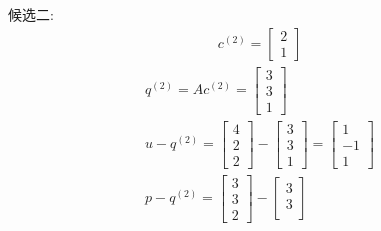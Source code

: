 \documentclass[12pt]{article}
\begin{document}
\begin{flushleft}
    候选二: \\
    \begin{align}
        c^{(2)} = \begin{bmatrix}
                      2 \\
                      1
                  \end{bmatrix}
    \end{align}
    \begin{align}
        q^{(2)} = Ac^{(2)} = \begin{bmatrix}
                                 3 \\
                                 3 \\
                                 1
                             \end{bmatrix}                           \\
        u -q^{(2)} = \begin{bmatrix}
                         4 \\
                         2 \\
                         2
                     \end{bmatrix} - \begin{bmatrix}
                                         3 \\
                                         3 \\
                                         1
                                     \end{bmatrix} =  \begin{bmatrix}
                                                          1  \\
                                                          -1 \\
                                                          1
                                                      \end{bmatrix}  \\
        p - q^{(2)} = \begin{bmatrix}
                          3 \\
                          3 \\
                          2
                      \end{bmatrix} -  \begin{bmatrix}
                                           3 \\
                                           3 \\

\end{bmatrix}
\end{align}
\end{flushleft}
\end{document}
